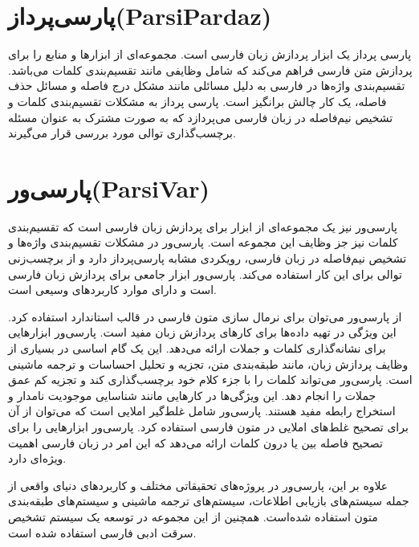 \section{ پارسی‌پرداز(ParsiPardaz)}
\hspace{30pt}
پارسی پرداز یک ابزار پردازش زبان فارسی است. مجموعه‌ای از ابزارها و منابع را برای پردازش متن فارسی فراهم می‌کند که شامل وظایفی مانند تقسیم‌بندی کلمات می‌باشد. تقسیم‌بندی واژه‌ها در فارسی به دلیل مسائلی مانند مشکل درج فاصله و مسائل حذف فاصله، یک کار چالش برانگیز است.
پارسی پرداز به مشکلات تقسیم‌بندی کلمات و تشخیص نیم‌فاصله در زبان فارسی می‌پردازد که به صورت مشترک به عنوان مسئله برچسب‌گذاری توالی مورد بررسی قرار می‌گیرند. \cite{sarabi2013parsipardaz}

\section{ پارسی‌ور(ParsiVar)}
\hspace{30pt}
پارسی‌ور نیز یک مجموعه‌ای از ابزار برای پردازش زبان فارسی است که تقسیم‌بندی کلمات نیز جز وظایف این مجموعه است. پارسی‌ور در مشکلات تقسیم‌بندی واژه‌ها و تشخیص نیم‌فاصله در زبان فارسی، رویکردی مشابه پارسی‌پرداز دارد و از برچسب‌زنی توالی برای این کار استفاده می‌کند. پارسی‌ور ابزار جامعی برای پردازش زبان فارسی است و دارای موارد کاربردهای وسیعی است.

از پارسی‌ور می‌توان برای نرمال سازی متون فارسی در قالب استاندارد استفاده کرد. این ویژگی در تهیه داده‌ها برای کارهای پردازش زبان مفید است. پارسی‌ور ابزارهایی برای نشانه‌گذاری کلمات و جملات ارائه می‌دهد. این یک گام اساسی در بسیاری از وظایف پردازش زبان، مانند طبقه‌بندی متن، تجزیه و تحلیل احساسات و ترجمه ماشینی است. پارسی‌ور می‌تواند کلمات را با جزء کلام خود برچسب‌گذاری کند و تجزیه کم عمق جملات را انجام دهد. این ویژگی‌ها در کارهایی مانند شناسایی موجودیت نامدار و استخراج رابطه مفید هستند. پارسی‌ور شامل غلط‌گیر املایی است که می‌توان از آن برای تصحیح غلط‌های املایی در متون فارسی استفاده کرد. پارسی‌ور ابزارهایی را برای تصحیح فاصله بین یا درون کلمات ارائه می‌دهد که این امر در زبان فارسی اهمیت ویژه‌ای دارد.

علاوه بر این، پارسی‌ور در پروژه‌های تحقیقاتی مختلف و کاربردهای دنیای واقعی از جمله سیستم‌های بازیابی اطلاعات، سیستم‌های ترجمه ماشینی و سیستم‌های طبقه‌بندی متون استفاده شده‌است. همچنین از این مجموعه در توسعه یک سیستم تشخیص سرقت ادبی فارسی استفاده شده است.\cite{mohtaj2018parsivar}




